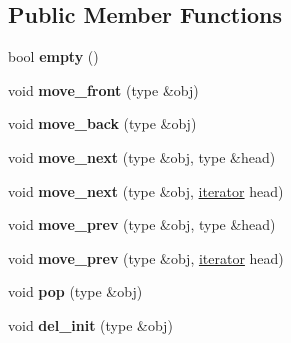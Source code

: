 \subsection*{Public Member Functions}
\begin{DoxyCompactItemize}
\item 
bool {\bfseries empty} ()\hypertarget{classgxx_1_1dlist_a73a909024bde20ad7e505c4bccfe6b35}{}\label{classgxx_1_1dlist_a73a909024bde20ad7e505c4bccfe6b35}

\item 
void {\bfseries move\+\_\+front} (type \&obj)\hypertarget{classgxx_1_1dlist_a83c8c62fd74a1ced6220728883209579}{}\label{classgxx_1_1dlist_a83c8c62fd74a1ced6220728883209579}

\item 
void {\bfseries move\+\_\+back} (type \&obj)\hypertarget{classgxx_1_1dlist_afa913fb0aa1cb04dfd47dc6ef2972193}{}\label{classgxx_1_1dlist_afa913fb0aa1cb04dfd47dc6ef2972193}

\item 
void {\bfseries move\+\_\+next} (type \&obj, type \&head)\hypertarget{classgxx_1_1dlist_a125345d98846237a75e517a865b680db}{}\label{classgxx_1_1dlist_a125345d98846237a75e517a865b680db}

\item 
void {\bfseries move\+\_\+next} (type \&obj, \hyperlink{classgxx_1_1dlist_1_1iterator}{iterator} head)\hypertarget{classgxx_1_1dlist_a0510d98090a688d7a60bb1522f0a2e9e}{}\label{classgxx_1_1dlist_a0510d98090a688d7a60bb1522f0a2e9e}

\item 
void {\bfseries move\+\_\+prev} (type \&obj, type \&head)\hypertarget{classgxx_1_1dlist_a182cd64f52ffda131a53a24cd0eac1a9}{}\label{classgxx_1_1dlist_a182cd64f52ffda131a53a24cd0eac1a9}

\item 
void {\bfseries move\+\_\+prev} (type \&obj, \hyperlink{classgxx_1_1dlist_1_1iterator}{iterator} head)\hypertarget{classgxx_1_1dlist_a207501ebd24f81980286311080095c80}{}\label{classgxx_1_1dlist_a207501ebd24f81980286311080095c80}

\item 
void {\bfseries pop} (type \&obj)\hypertarget{classgxx_1_1dlist_a93f5fc340642c0e0e638a20c65c13633}{}\label{classgxx_1_1dlist_a93f5fc340642c0e0e638a20c65c13633}

\item 
void {\bfseries del\+\_\+init} (type \&obj)\hypertarget{classgxx_1_1dlist_a7dc34a0db5bf47bb7f61679af2355139}{}\label{classgxx_1_1dlist_a7dc34a0db5bf47bb7f61679af2355139}


\end{DoxyCompactItemize}
